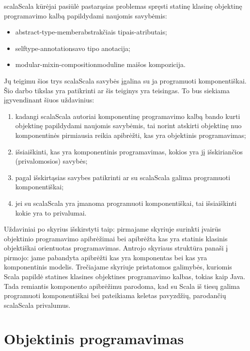 \gls{scala}{Scala} kūrėjai pasiūlė pastarąsias problemas spręsti
statinę klasinę objektinę programavimo kalbą papildydami naujomis
savybėmis\cite{scalable-component-abstractions}:
\begin{itemize}
  \item \gls{abstract-type-member}{abstrakčiais tipais-atributais};
  \item \gls{selftype-annotation}{savo tipo anotacija};
  \item \gls{modular-mixin-composition}{moduline maišos kompozicija}.
\end{itemize}
Jų teigimu\cite[1]{scalable-component-abstractions} šios trys
\gls{scala}{Scala} savybės įgalina su ja programuoti komponentiškai.
Šio darbo tikslas yra patikrinti ar šis teiginys yra teisingas.
To bus siekiama įgyvendinant šiuos uždavinius:
\begin{enumerate}
  \item kadangi \gls{scala}{Scala} autoriai komponentinę programavimo
    kalbą bando kurti objektinę papildydami naujomis savybėmis, tai
    norint atskirti objektinę nuo komponentinės pirmiausia reikia
    apibrėžti, kas yra objektinis programavimas;
  \item išsiaiškinti, kas yra komponentinis programavimas, kokios
    yra jį išskiriančios (privalomosios) savybės;
  \item pagal išskirtąsias savybes patikrinti ar su \gls{scala}{Scala}
    galima programuoti komponentiškai;
  \item jei su \gls{scala}{Scala} yra įmanoma programuoti
    komponentiškai, tai išsiaiškinti kokie yra to privalumai.
\end{enumerate}

Uždaviniai po skyrius išskirstyti taip: pirmajame skyriuje surinkti
įvairūs objektinio programavimo apibrėžimai bei apibrėžta kas
yra statinis klasinis objektiškai orientuotas programavimas.
Antrojo skyriaus struktūra panaši į pirmojo: jame pabandyta
apibrėžti kas yra komponentas bei kas yra komponentinis modelis.
Trečiajame skyriuje pristatomos galimybės, kuriomis Scala
papildė statines klasines objektines programavimo kalbas, tokias
kaip Java. Tada remiantis komponento apibrėžimu parodoma, kad
su Scala iš tiesų galima programuoti komponentiškai bei pateikiama
keletas pavyzdžių, parodančių \gls{scala}{Scala} privalumus.


\chapter{Objektinis programavimas}

